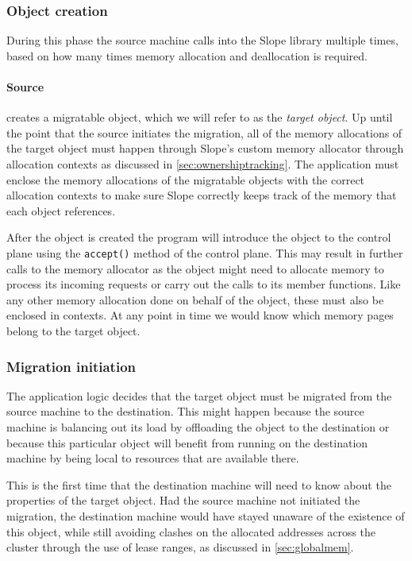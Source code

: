 \subsubsection{Object creation}
During this phase the source machine calls into the Slope library multiple
times, based on how many times memory allocation and deallocation is required.

\paragraph{Source}
creates a migratable object, which we will refer to as the \emph{target object}.
Up until the point that
the source initiates the migration, all of the memory allocations of the target object
must happen through
Slope's custom memory allocator through allocation contexts as discussed in
\autoref{sec:ownershiptracking}.
The application must enclose the memory allocations of the migratable objects
with the correct allocation contexts to make sure Slope correctly keeps track of the
memory that each object references.

After the object is created the program will introduce the object to the
control plane using the \texttt{accept()} method of the control plane.
This may result in further calls to the memory allocator as
the object might need to allocate memory to process its incoming
requests or carry out the calls to its member functions.
Like any other memory allocation done on behalf of the object, these must
also be enclosed in contexts. At any point in time we would know which
memory pages belong to the target object.

\subsubsection{Migration initiation}
The application logic decides that the target object must be migrated from the
source machine to the destination. This might happen because the source machine
is balancing out its load by offloading the object to the destination or because
this particular object will benefit from running on the destination machine
by being local to resources that are available there.

This is the first time that the destination
machine will need to know about the properties of the target object. Had the
source machine not initiated the migration, the destination machine would have
stayed unaware of the existence of this object, while still avoiding
clashes on the allocated addresses across the cluster through the
use of lease ranges, as discussed in \autoref{sec:globalmem}.

